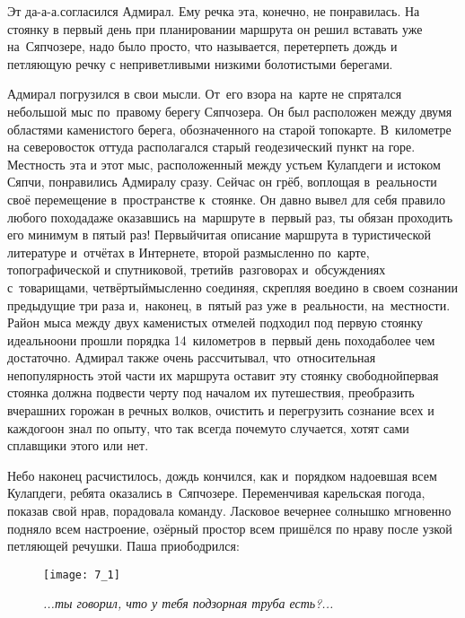 \diagdash Эт да-а-а.\mdash согласился Адмирал. Ему речка эта, конечно, не понравилась. На стоянку в первый день при планировании маршрута  он решил вставать уже на~Сяпчозере, надо было просто, что называется, перетерпеть дождь и петляющую речку с неприветливыми низкими болотистыми берегами. 

Адмирал погрузился в свои мысли. От~его взора на~карте не спрятался небольшой мыс по~правому берегу Сяпчозера. Он был расположен между двумя областями каменистого берега, обозначенного на старой топокарте. В~километре на северо\sdash восток оттуда располагался старый геодезический пункт на горе. Местность эта и этот мыс, расположенный между устьем Кулапдеги и истоком Сяпчи, понравились Адмиралу сразу. Сейчас он грёб, воплощая в~реальности своё перемещение в~пространстве к~стоянке. Он давно вывел для себя правило любого похода\mdash даже оказавшись на~маршруте в~первый раз, ты обязан проходить его минимум в пятый раз! Первый\mdash читая описание маршрута в туристической литературе и~отчётах в Интернете, второй раз\mdash мысленно по~карте, топографической и спутниковой, третий\mdash в~разговорах и~обсуждениях с~товарищами, четвёртый\mdash мысленно соединяя, скрепляя воедино в своем сознании предыдущие три раза и,~наконец, в~пятый раз уже в~реальности, на~местности. Район мыса между двух каменистых отмелей подходил под первую стоянку идеально\mdash они прошли порядка 14~километров в~первый день похода\mdash более чем достаточно. Адмирал также очень рассчитывал, что~относительная непопулярность этой части их маршрута оставит эту стоянку свободной\mdash первая стоянка должна подвести черту под началом их путешествия, преобразить вчерашних горожан в речных волков, очистить и перегрузить сознание всех и каждого\mdash он знал по опыту, что так всегда почему\sdash то случается, хотят сами сплавщики этого или нет. 

Небо наконец расчистилось, дождь кончился, как и~порядком надоевшая всем Кулапдеги, ребята оказались в~Сяпчозере. Переменчивая карельская погода, показав свой нрав, порадовала команду. Ласковое вечернее солнышко мгновенно подняло всем настроение, озёрный простор всем пришёлся по нраву после узкой петляющей речушки. Паша приободрился:

\begin{figure}[h]
	\centering
	\texttt{[image: 7\_1]}
	\caption{\small\textit{...ты говорил, что у тебя подзорная труба есть?...}}
\end{figure}


